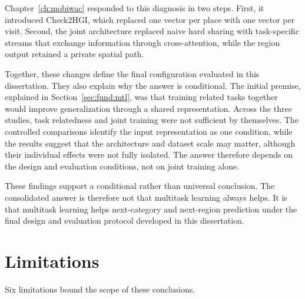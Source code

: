 Chapter~\ref{ch:mobiwac} responded to this diagnosis in two steps. First, it introduced
Check2HGI, which replaced one vector per place with one vector per visit. Second, the
joint architecture replaced naive hard sharing with task-specific streams that exchange
information through cross-attention, while the region output retained a private spatial
path.

Together, these changes define the final configuration evaluated in this dissertation.
They also explain why the answer is conditional. The initial premise, explained in
Section~\ref{sec:fund:mtl}, was that training related tasks together would improve
generalization through a shared representation. Across the three studies, task
relatedness and joint training were not sufficient by themselves.
The controlled comparisons identify the input representation as one condition,
while the results suggest that the architecture and dataset scale may matter, although their
individual effects were not fully isolated. The answer therefore depends on the design and
evaluation conditions, not on joint training alone.

These findings support a conditional rather than universal conclusion.
The consolidated answer is therefore not that multitask learning always helps.
It is that multitask learning helps next-category and next-region prediction under
the final design and evaluation protocol developed in this dissertation.

\section{Limitations}
\label{sec:conc:limitations}

Six limitations bound the scope of these conclusions.


